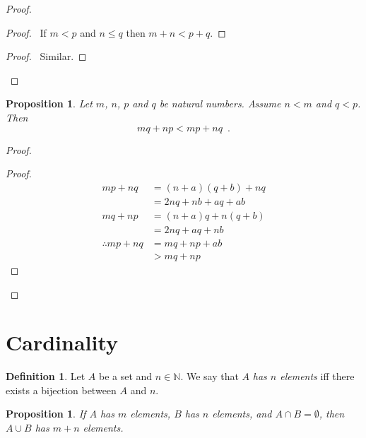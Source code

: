 \documentclass{book}
\let\qed\relax
\newtheorem{prop}[ax]{Proposition}
\theoremstyle{definition}
\newtheorem{df}[ax]{Definition}
\begin{document}
\begin{proof}
\pf
{}
\begin{proof}
	\pf\ If $m < p$ and $n \leq q$ then $m+n < p + q$.
\end{proof}
\begin{proof}
	\pf\ Similar.
\end{proof}
\qed
\end{proof}

\begin{prop}
Let $m$, $n$, $p$ and $q$ be natural numbers. Assume $n < m$ and $q < p$. Then
\[ mq + np < mp + nq \enspace . \]
\end{prop}

\begin{proof}
\pf
{}
\begin{proof}
	\pf
	\begin{align*}
		mp + nq & = (n+a) (q + b) + nq \\
		& = 2nq + nb + aq + ab \\
		mq + np & = (n + a) q + n (q + b) \\
		& = 2nq + aq + nb \\
		\therefore mp + nq & = mq + np + ab \\
		& > mq + np
	\end{align*}
\end{proof}
\qed
\end{proof}

\section{Cardinality}

\begin{df}
Let $A$ be a set and $n \in \mathbb{N}$. We say that $A$ \emph{has $n$ elements} iff there exists a bijection between $A$ and $n$.
\end{df}

\begin{prop}
\label{prop:cardsum}
If $A$ has $m$ elements, $B$ has $n$ elements, and $A \cap B = \emptyset$, then $A \cup B$ has $m + n$ elements.
\end{prop}
\end{document}
